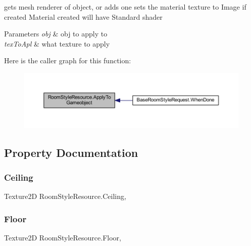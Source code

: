 gets mesh renderer of object, or adds one sets the material texture to Image if created Material created will have Standard shader 


\begin{DoxyParams}{Parameters}
{\em obj} & obj to apply to\\
\hline
{\em tex\+To\+Apl} & what texture to apply\\
\hline
\end{DoxyParams}
Here is the caller graph for this function\+:
\nopagebreak
\begin{figure}[H]
\begin{center}
\leavevmode
\includegraphics[width=350pt]{class_room_style_resource_a631919fd4d90b01b2bfad87a30a6b7b2_icgraph}
\end{center}
\end{figure}


\subsection{Property Documentation}
\mbox{\label{class_room_style_resource_ab07f5729c88a8a7229e1e625ef859d38}} 
\subsubsection{\texorpdfstring{Ceiling}{Ceiling}}
{\footnotesize\ttfamily Texture2D Room\+Style\+Resource.\+Ceiling\hspace{0.3cm}{\ttfamily [get]}, {\ttfamily [set]}}

\mbox{\label{class_room_style_resource_a9bb9edda92402b8e4889a168dfa13d6a}} 
\subsubsection{\texorpdfstring{Floor}{Floor}}
{\footnotesize\ttfamily Texture2D Room\+Style\+Resource.\+Floor\hspace{0.3cm}{\ttfamily [get]}, {\ttfamily [set]}}

